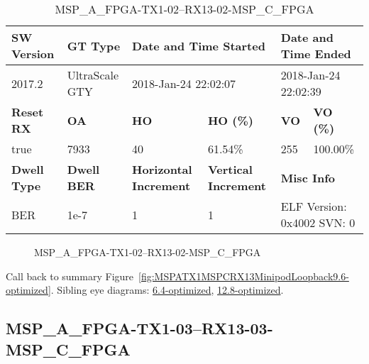 \begin{table}[h]
\centering
\caption{MSP\_A\_FPGA-TX1-02--RX13-02-MSP\_C\_FPGA}
\label{tab:MSPAFPGATX102RX1302MSPCFPGA9.6-optimized}
\begin{tabular}{@{}|l|l|l|l|l|l|@{}}
\toprule
\textbf{SW Version}                & \textbf{GT Type}   & \multicolumn{2}{l|}{\textbf{Date and Time Started}}            & \multicolumn{2}{l|}{\textbf{Date and Time Ended}}        \\ \midrule
2017.2                       & UltraScale GTY          & \multicolumn{2}{l|}{2018-Jan-24 22:02:07}                   & \multicolumn{2}{l|}{2018-Jan-24 22:02:39}               \\ \midrule
\textbf{Reset RX}                  & \textbf{OA} & \textbf{HO}   & \textbf{HO (\%)} & \textbf{VO} & \textbf{VO (\%)} \\ \midrule
true & 7933        & 40          & 61.54\%        & 255        & 100.00\%       \\ \midrule
\textbf{Dwell Type}                & \textbf{Dwell BER} & \textbf{Horizontal Increment} & \textbf{Vertical Increment}    & \multicolumn{2}{l|}{\textbf{Misc Info}}                  \\ \midrule
BER                            & 1e-7        & 1        & 1           & \multicolumn{2}{l|}{ELF Version: 0x4002 SVN: 0}                         \\ \bottomrule
\end{tabular}
\end{table}

\begin{figure}[h]
\caption{MSP\_A\_FPGA-TX1-02--RX13-02-MSP\_C\_FPGA} \label{fig:MSPAFPGATX102RX1302MSPCFPGA9.6-optimized}
\end{figure}

Call back to summary Figure~\ref{fig:MSPATX1MSPCRX13MinipodLoopback9.6-optimized}.
Sibling eye diagrams: \hyperref[sec:MSPAFPGATX102RX1302MSPCFPGA6.4-optimized]{6.4-optimized}, \hyperref[sec:MSPAFPGATX102RX1302MSPCFPGA12.8-optimized]{12.8-optimized}.

\clearpage
\newpage


\subsection{MSP\_A\_FPGA-TX1-03--RX13-03-MSP\_C\_FPGA}\label{sec:MSPAFPGATX103RX1303MSPCFPGA9.6-optimized}

